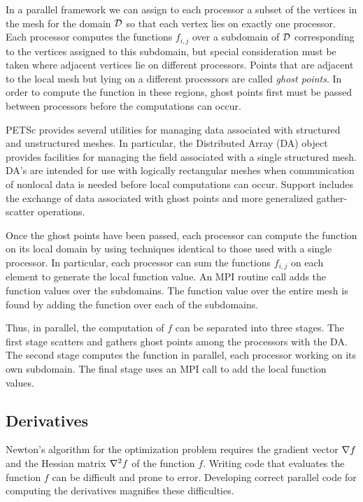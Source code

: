 In a parallel framework we can assign to each processor a
subset of the vertices in the mesh for the domain $ \mbox{$\cal D$} $ so
that each vertex lies on exactly one processor.  Each
processor computes the functions $ f_{i,j} $ over a subdomain of $ \mbox{$\cal D$} $
corresponding to the vertices assigned to this subdomain,
but special consideration must be taken where adjacent
vertices lie on different processors.  Points that are
adjacent to the local mesh but lying on a different
processors are called \textit{ghost points}.  In order to compute the
function in these regions, ghost points first must be passed
between processors before the computations can occur.

PETSc \cite{PETSc-manual,petsc-home} provides several
utilities for managing data associated with
structured and unstructured meshes.  In particular, the
Distributed Array (DA) object 
provides facilities for managing the
field associated with a single structured mesh.  DA's 
are intended for use with logically rectangular meshes
when communication of nonlocal data is needed before local
computations can occur.  Support includes the
exchange of data associated with ghost points and more
generalized gather-scatter operations.

Once the ghost points have been passed, each processor can
compute the function on its local domain by using techniques
identical to those used with a single processor.  In
particular, each processor can sum the functions $ f_{i,j} $
on each element to generate the local function value.  An MPI routine
call adds the function values over the subdomains.  The
function value over the entire mesh is found by adding the
function over each of the subdomains.

Thus, in parallel, the computation of $f$ can be separated
into three stages.  The first stage scatters and gathers
ghost points among the processors with the DA.
The second stage computes the function in
parallel, each processor working on its own subdomain.  The
final stage uses an MPI call to add the local function
values.


\subsection{Derivatives}

Newton's algorithm for the optimization problem
 requires the gradient vector $ \nabla f $
and the Hessian matrix $ \nabla^2 f $ of the function $f$.
Writing code that evaluates the function
$f$ can be difficult and prone to error.
Developing correct parallel code for computing the 
derivatives magnifies these difficulties.

